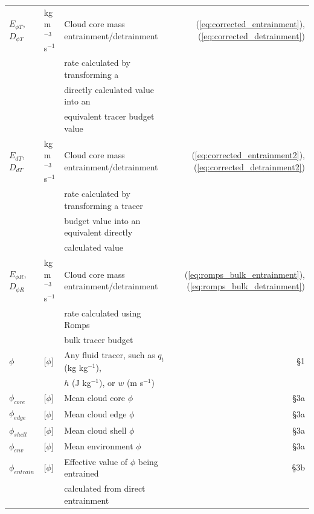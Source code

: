 \documentclass[12pt]{article}
\begin{document}
\begin{appendix}
\begin{table}[t]
\begin{center}
\begin{tabular}{lllr}
 $E_{\phi T}$, $D_{\phi T}$
    & kg m$^{-3}$ s$^{-1}$ 
    & Cloud core mass entrainment/detrainment  
    &  (\ref{eq:corrected_entrainment}), (\ref{eq:corrected_detrainment}) \\
   && rate calculated by transforming a   & \\
   && directly calculated value into an  & \\
   && equivalent tracer budget value & \\
     
 $E_{d T}$, $D_{d T}$
    & kg m$^{-3}$ s$^{-1}$ 
    & Cloud core mass entrainment/detrainment 
    &  (\ref{eq:corrected_entrainment2}), (\ref{eq:corrected_detrainment2}) \\
   && rate calculated by transforming a tracer & \\
   && budget value into an equivalent directly  & \\
   && calculated value & \\

 $E_{\phi R}$, $D_{\phi R}$     
    & kg m$^{-3}$ s$^{-1}$ 
    & Cloud core mass entrainment/detrainment
    &  (\ref{eq:romps_bulk_entrainment}), (\ref{eq:romps_bulk_detrainment}) \\
   && rate calculated using Romps & \\
   && bulk tracer budget & \\

 $\phi$    
    & [$\phi$]            
    & Any fluid tracer, such as $q_t$ (kg kg$^{-1}$), 
    & \S 1 \\
   && $h$ (J kg$^{-1}$), or $w$ (m s$^{-1}$) & \\

 $\phi_{core}$    
    & [$\phi$]            
    & Mean cloud core $\phi$
    & \S 3a \\

 $\phi_{edge}$    
    & [$\phi$]            
    & Mean cloud edge $\phi$
    & \S 3a \\

 $\phi_{shell}$   
    & [$\phi$]            
    & Mean cloud shell $\phi$
    & \S 3a \\

 $\phi_{env}$     
    & [$\phi$]            
    & Mean environment $\phi$
    & \S 3a \\

 $\phi_{entrain}$ 
    & [$\phi$]            
    & Effective value of $\phi$ being entrained
    & \S 3b \\
   && calculated from direct entrainment& \\


\end{tabular}
\end{center}
\end{table}
\end{appendix}
\end{document}
